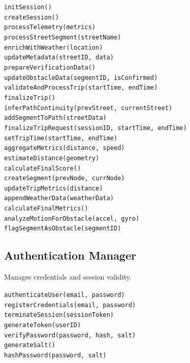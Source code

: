         \texttt{initSession()}\\
        \texttt{createSession()}\\
        \texttt{processTelemetry(metrics)}\\
        \texttt{processStreetSegment(streetName)}\\
        \texttt{enrichWithWeather(location)}\\
        \texttt{updateMetadata(streetID, data)}\\
        \texttt{prepareVerificationData()}\\
        \texttt{updateObstacleData(segmentID, isConfirmed)}\\
        \texttt{validateAndProcessTrip(startTime, endTime)}\\
        \texttt{finalizeTrip()}\\
        \texttt{inferPathContinuity(prevStreet, currentStreet)}\\
        \texttt{addSegmentToPath(streetData)}\\
        \texttt{finalizeTripRequest(sessionID, startTime, endTime)}\\
        \texttt{setTripTime(startTime, endTime)}\\
        \texttt{aggregateMetrics(distance, speed)}\\
        \texttt{estimateDistance(geometry)}\\
        \texttt{calculateFinalScore()}\\
        \texttt{createSegment(prevNode, currNode)}\\
        \texttt{updateTripMetrics(distance)}\\
        \texttt{appendWeatherData(weatherData)}\\
        \texttt{calculateFinalMetrics()}\\
        \texttt{analyzeMotionForObstacle(accel, gyro)}\\
        \texttt{flagSegmentAsObstacle(segmentID)}


\subsection{Authentication Manager}
Manages credentials and session validity.
    
        \texttt{authenticateUser(email, password)}\\
        \texttt{registerCredentials(email, password)}\\
        \texttt{terminateSession(sessionToken)}\\
        \texttt{generateToken(userID)}\\
        \texttt{verifyPassword(password, hash, salt)}\\
        \texttt{generateSalt()}\\
        \texttt{hashPassword(password, salt)}

